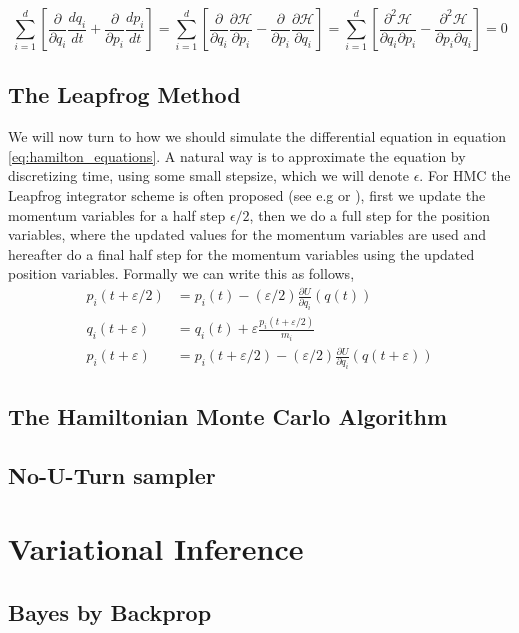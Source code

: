 \begin{equation*}
    \sum_{i=1}^{d}\left[\frac{\partial}{\partial q_{i}} \frac{d q_{i}}{d t}+\frac{\partial}{\partial p_{i}} \frac{d p_{i}}{d t}\right]=\sum_{i=1}^{d}\left[\frac{\partial}{\partial q_{i}} \frac{\partial \mathcal{H}}{\partial p_{i}}-\frac{\partial}{\partial p_{i}} \frac{\partial \mathcal{H}}{\partial q_{i}}\right]=\sum_{i=1}^{d}\left[\frac{\partial^{2} \mathcal{H}}{\partial q_{i} \partial p_{i}}-\frac{\partial^{2} \mathcal{H}}{\partial p_{i} \partial q_{i}}\right]=0
\end{equation*}

\subsection{The Leapfrog Method}
We will now turn to how we should simulate the differential equation in equation \ref{eq:hamilton_equations}. A natural way is to approximate the equation by discretizing time, using some small stepsize, which we will denote $\epsilon$.
For HMC the Leapfrog integrator scheme is often proposed (see e.g \cite{betancourt2017conceptual} or \cite{neal2012bayesian}), first we update the momentum variables for a half step $\epsilon/2$, then we do a full step for the position variables, where the updated values for the momentum variables are used and hereafter do a final half step for the momentum variables using the updated position variables. Formally we can write this as follows,
\begin{equation*}
\begin{split}
p_{i}(t+\varepsilon / 2) &=p_{i}(t)-(\varepsilon / 2) \frac{\partial U}{\partial q_{i}}(q(t)) \\
q_{i}(t+\varepsilon) &=q_{i}(t)+\varepsilon \frac{p_{i}(t+\varepsilon / 2)}{m_{i}} \\
p_{i}(t+\varepsilon) &=p_{i}(t+\varepsilon / 2)-(\varepsilon / 2) \frac{\partial U}{\partial q_{i}}(q(t+\varepsilon))
\end{split}
\end{equation*}


\subsection{The Hamiltonian Monte Carlo Algorithm}


\subsection{No-U-Turn sampler}

\section{Variational Inference}
\subsection{Bayes by Backprop}
